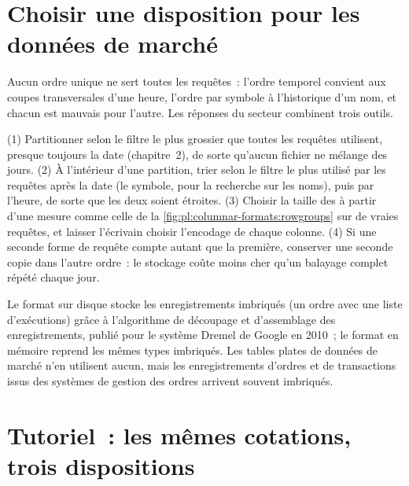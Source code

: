 \section{Choisir une disposition pour les données de marché}

Aucun ordre unique ne sert toutes les requêtes~: l'ordre temporel convient aux coupes transversales d'une heure, l'ordre par symbole à l'historique d'un nom,
et chacun est mauvais pour l'autre. Les réponses du secteur combinent trois outils.

\begin{method}\label{met:pl:columnar-formats:layout}
(1) Partitionner selon le filtre le plus grossier que toutes les requêtes utilisent, presque toujours la date (chapitre~2), de sorte qu'aucun fichier ne mélange des jours.
(2) À l'intérieur d'une partition, trier selon le filtre le plus utilisé par les requêtes après la date (le symbole, pour la recherche sur les noms), puis par
l'heure, de sorte que les deux  soient étroites. (3) Choisir la taille des  à partir d'une mesure comme celle de la
\cref{fig:pl:columnar-formats:rowgroups} sur de vraies requêtes, et laisser l'écrivain choisir l'encodage de chaque colonne. (4) Si une seconde forme de requête
compte autant que la première, conserver une seconde copie dans l'autre ordre~: le stockage coûte moins cher qu'un balayage complet répété chaque
jour.
\end{method}

\begin{remark}\label{rem:pl:columnar-formats:dremel}
Le format sur disque stocke les enregistrements imbriqués (un ordre avec une liste d'exécutions) grâce à l'algorithme de découpage et d'assemblage des enregistrements,
publié pour le système Dremel de Google en 2010~; le format en mémoire reprend les mêmes types imbriqués. Les tables plates de données de marché
n'en utilisent aucun, mais les enregistrements d'ordres et de transactions issus des systèmes de gestion des ordres arrivent souvent imbriqués.
\end{remark}

\section{Tutoriel~: les mêmes cotations, trois dispositions}\label{tut:pl:columnar-formats:tut}

